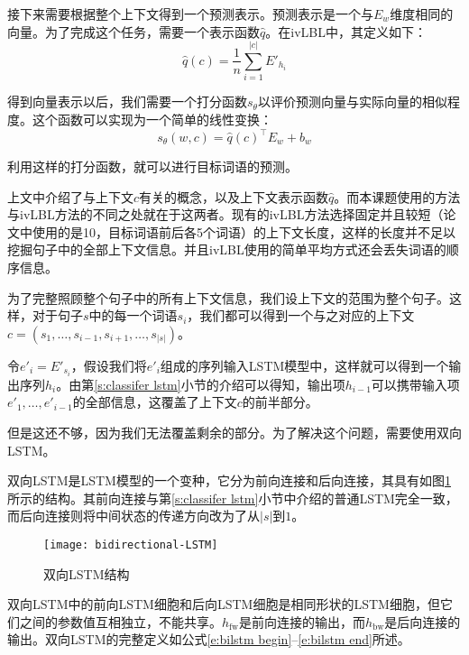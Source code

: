 接下来需要根据整个上下文得到一个预测表示。预测表示是一个与$E_w$维度相同的向量。为了完成这个任务，需要一个表示函数$\hat{q}$。在ivLBL中，其定义如下：
\begin{equation}
\hat{q}(c) = \frac{1}{n}\sum_{i = 1}^{|c|}E'_{h_i}
\end{equation}

得到向量表示以后，我们需要一个打分函数$s_\theta$以评价预测向量与实际向量的相似程度。这个函数可以实现为一个简单的线性变换：
\begin{equation}
s_\theta(w, c) = \hat{q}(c)^\intercal E_w + b_w
\label{e:scoring}
\end{equation}

利用这样的打分函数，就可以进行目标词语的预测。

上文中介绍了与上下文$c$有关的概念，以及上下文表示函数$\hat{q}$。而本课题使用的方法与ivLBL方法的不同之处就在于这两者。现有的ivLBL方法选择固定并且较短（论文中使用的是10，目标词语前后各5个词语）的上下文长度，这样的长度并不足以挖掘句子中的全部上下文信息。并且ivLBL使用的简单平均方式还会丢失词语的顺序信息。

为了完整照顾整个句子中的所有上下文信息，我们设上下文的范围为整个句子。这样，对于句子$s$中的每一个词语$s_i$，我们都可以得到一个与之对应的上下文$c = (s_1, \dots, s_{i - 1}, s_{i + 1}, \dots, s_{|s|})$。

令$e'_i = E'_{s_i}$，假设我们将$e'_i$组成的序列输入LSTM模型中，这样就可以得到一个输出序列$h_i$。由第\ref{s:classifer lstm}小节的介绍可以得知，输出项$h_{i - 1}$可以携带输入项$e'_1, \dots, e'_{i - 1}$的全部信息，这覆盖了上下文$c$的前半部分。

但是这还不够，因为我们无法覆盖剩余的部分。为了解决这个问题，需要使用双向LSTM。

双向LSTM是LSTM模型的一个变种，它分为前向连接和后向连接，其具有如图\ref{f:bidirectional lstm}所示的结构。其前向连接与第\ref{s:classifer lstm}小节中介绍的普通LSTM完全一致，而后向连接则将中间状态的传递方向改为了从$|s|$到$1$。

\begin{figure}[h]
	\centering
	\texttt{[image: bidirectional-LSTM]}
	\caption{双向LSTM结构}
	\label{f:bidirectional lstm}
	\vspace{-1em}
\end{figure}

双向LSTM中的前向LSTM细胞和后向LSTM细胞是相同形状的LSTM细胞，但它们之间的参数值互相独立，不能共享。$h_\text{fw}$是前向连接的输出，而$h_\text{bw}$是后向连接的输出。双向LSTM的完整定义如公式\ref{e:bilstm begin}--\ref{e:bilstm end}所述。

